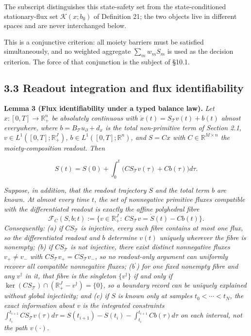 \documentclass[11pt]{article}
\begin{document}
The subscript distinguishes this state-safety set from the state-conditioned stationary-flux set \(\mathcal K(x;b_0)\) of Definition 21; the two objects live in different spaces and are never interchanged below.

 This is a conjunctive criterion: all moiety barriers must be satisfied simultaneously, and no weighted aggregate \(\sum_m w_m S_m\) is used as the decision criterion. The force of that conjunction is the subject of \S10.1.

\subsection*{3.3 Readout integration and flux identifiability}\label{33-readout-integration-and-flux-identifiability}

\textbf{Lemma 3 (Flux identifiability under a typed balance law).} \emph{Let \(x : [0,T] \to \mathbb{R}_+^n\) be absolutely continuous with \(\dot x(t) = S_{\mathcal{T}} v(t) + b(t)\) almost everywhere, where \(b=B_{\mathcal{T}}u_\partial+d_x\) is the total non-primitive term of Section 2.1, \(v \in L^1([0,T]; \mathbb{R}_+^J)\), \(b \in L^1([0,T]; \mathbb{R}^n)\), and \(S = Cx\) with \(C \in \mathbb{R}^{M \times n}\) the moiety-composition readout. Then} 

$$S(t) = S(0) + \int_0^t \bigl( C S_{\mathcal{T}} v(\tau) + Cb(\tau) \bigr) d\tau.$$

 \emph{Suppose, in addition, that the readout trajectory \(S\) and the total term \(b\) are known. At almost every time \(t\), the set of nonnegative primitive fluxes compatible with the differentiated readout is exactly the affine polyhedral fibre}
$$\mathcal F_C(S,b;t):=\{v\in\mathbb R_+^J:\ CS_{\mathcal{T}}v=\dot S(t)-Cb(t)\}.$$
\emph{Consequently: (a) if \(CS_{\mathcal{T}}\) is injective, every such fibre contains at most one flux, so the differentiated readout and \(b\) determine \(v(t)\) uniquely wherever the fibre is nonempty; (b) if \(CS_{\mathcal{T}}\) is not injective, there exist distinct nonnegative fluxes \(v_+\ne v_-\) with \(CS_{\mathcal{T}}v_+=CS_{\mathcal{T}}v_-\), so no readout-only argument can uniformly recover all compatible nonnegative fluxes; (b$^\prime$) for one fixed nonempty fibre and any \(v^\dagger\) in it, that fibre is the singleton \(\{v^\dagger\}\) if and only if \(\ker(CS_{\mathcal{T}})\cap(\mathbb R_+^J-v^\dagger)=\{0\}\), so a boundary record can be uniquely explained without global injectivity; and (c) if \(S\) is known only at samples \(t_0<\cdots<t_N\), the exact information about \(v\) is the integrated constraints \(\int_{t_i}^{t_{i+1}}CS_{\mathcal{T}}v(\tau)d\tau=S(t_{i+1})-S(t_i)-\int_{t_i}^{t_{i+1}}Cb(\tau)d\tau\) on each interval, not the path \(v(\cdot)\).}
\end{document}
